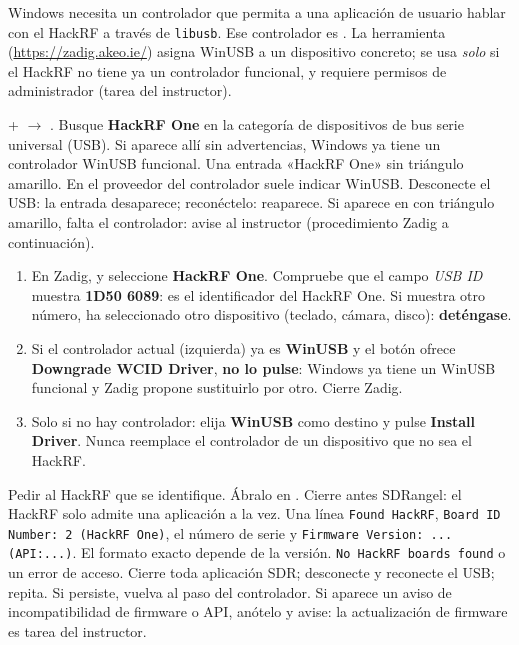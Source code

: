 Windows necesita un controlador que permita a una aplicación de usuario hablar con el HackRF a través de \texttt{libusb}. Ese controlador es . La herramienta  (\url{https://zadig.akeo.ie/}) asigna WinUSB a un dispositivo concreto; se usa \emph{solo} si el HackRF no tiene ya un controlador funcional, y requiere permisos de administrador (tarea del instructor).

{+ $\rightarrow$ .}
{Busque \textbf{HackRF One} en la categoría de dispositivos de bus serie universal (USB).}
{Si aparece allí sin advertencias, Windows ya tiene un controlador WinUSB funcional.}
{Una entrada «HackRF One» sin triángulo amarillo. En  el proveedor del controlador suele indicar WinUSB.}
{Desconecte el USB: la entrada desaparece; reconéctelo: reaparece.}
{Si aparece en  con triángulo amarillo, falta el controlador: avise al instructor (procedimiento Zadig a continuación).}

\begin{alerta}
\begin{enumerate}
  \item En Zadig,  y seleccione \textbf{HackRF One}. Compruebe que el campo \emph{USB ID} muestra \textbf{1D50 6089}: es el identificador del HackRF One. Si muestra otro número, ha seleccionado otro dispositivo (teclado, cámara, disco): \textbf{deténgase}.
  \item Si el controlador actual (izquierda) ya es \textbf{WinUSB} y el botón ofrece \textbf{Downgrade WCID Driver}, \textbf{no lo pulse}: Windows ya tiene un WinUSB funcional y Zadig propone sustituirlo por otro. Cierre Zadig.
  \item Solo si no hay controlador: elija \textbf{WinUSB} como destino y pulse \textbf{Install Driver}. Nunca reemplace el controlador de un dispositivo que no sea el HackRF.
\end{enumerate}
\end{alerta}

{Pedir al HackRF que se identifique. Ábralo en . Cierre antes SDRangel: el HackRF solo admite una aplicación a la vez.}
{Una línea \texttt{Found HackRF}, \texttt{Board ID Number: 2 (HackRF One)}, el número de serie y \texttt{Firmware Version: ... (API:...)}. El formato exacto depende de la versión.}
{\texttt{No HackRF boards found} o un error de acceso.}
{Cierre toda aplicación SDR; desconecte y reconecte el USB; repita. Si persiste, vuelva al paso del controlador. Si aparece un aviso de incompatibilidad de firmware o API, anótelo y avise: la actualización de firmware es tarea del instructor.}

